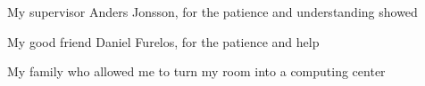 \newpage
\thispagestyle{empty}
\vfill
{}
My supervisor Anders Jonsson, for the patience and understanding showed

My good friend Daniel Furelos, for the patience and help

My family who allowed me to turn my room into a computing center
\vfill